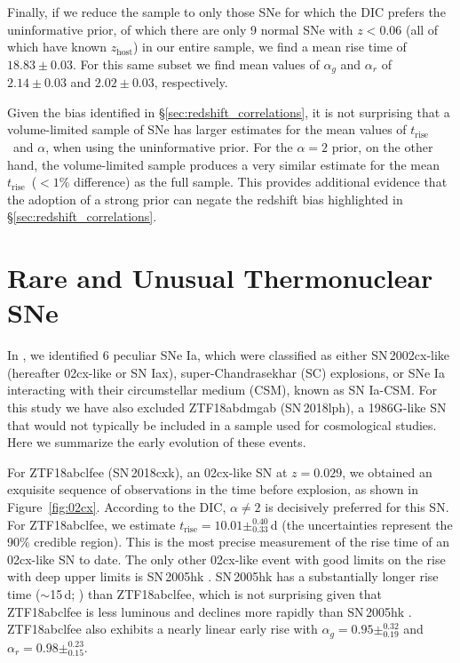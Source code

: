 \documentclass[twocolumn]{aastex63}
\newcommand{\trise}{$t_\mathrm{rise}$}
\begin{document}
Finally, if we reduce the sample to only those SNe for which the DIC prefers
the uninformative prior, of which there are only 9 normal SNe with $z < 0.06$
(all of which have known $z_\mathrm{host}$) in our entire sample, we find a
mean rise time of $18.83 \pm 0.03$. For this same subset we find mean values
of $\alpha_g$ and $\alpha_r$ of $2.14 \pm 0.03$ and $2.02 \pm 0.03$,
respectively.

Given the bias identified in \S\ref{sec:redshift_correlations}, it is not
surprising that a volume-limited sample of SNe has larger estimates for the
mean values of \trise\ and $\alpha$, when using the uninformative prior. For
the $\alpha = 2$ prior, on the other hand, the volume-limited sample produces
a very similar estimate for the mean \trise\ ($< 1\%$ difference) as the full
sample. This provides additional evidence that the adoption of a strong prior
can negate the redshift bias highlighted in \S\ref{sec:redshift_correlations}.

\section{Rare and Unusual Thermonuclear SNe}\label{sec:rare}

In \citet{Yao19}, we identified 6 peculiar SNe Ia, which were classified as
either SN\,2002cx-like (hereafter 02cx-like or SN Iax), super-Chandrasekhar
(SC) explosions, or SNe Ia interacting with their circumstellar medium (CSM),
known as SN Ia-CSM. For this study we have also excluded ZTF18abdmgab
(SN\,2018lph), a 1986G-like SN that would not typically be included in a
sample used for cosmological studies. Here we summarize the early evolution of
these events.

For ZTF18abclfee (SN\,2018cxk), an 02cx-like SN at $z = 0.029$, we obtained an
exquisite sequence of observations in the time before explosion, as shown in
Figure~\ref{fig:02cx}. According to the DIC, $\alpha \ne 2$ is decisively
preferred for this SN. For ZTF18abclfee, we estimate \trise$ = 10.01
\pm^{0.40}_{0.33}$\,d (the uncertainties represent the 90\% credible region).
This is the most precise measurement of the rise time of an 02cx-like SN to
date. The only other 02cx-like event with good limits on the rise with deep
upper limits is SN\,2005hk \citep{Phillips07}. SN\,2005hk has a substantially
longer rise time ($\sim$15\,d; \citealt{Phillips07}) than ZTF18abclfee, which
is not surprising given that ZTF18abclfee is less luminous and declines more
rapidly than SN\,2005hk \citep{Miller17a,Yao19}. ZTF18abclfee also exhibits a
nearly linear early rise with $\alpha_g = 0.95 \pm^{0.32}_{0.19}$ and
$\alpha_r = 0.98 \pm^{0.23}_{0.15}$.
\end{document}
